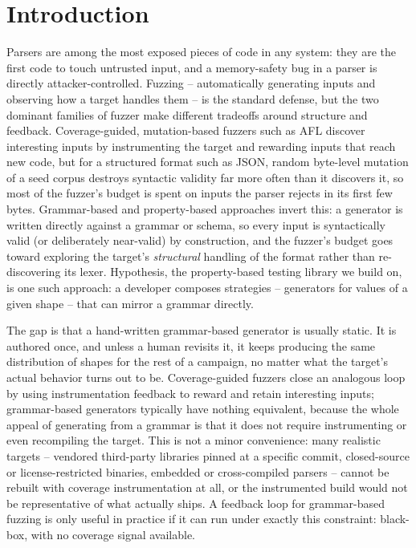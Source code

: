 \section{Introduction}

Parsers are among the most exposed pieces of code in any system: they are
the first code to touch untrusted input, and a memory-safety bug in a parser
is directly attacker-controlled. Fuzzing -- automatically generating inputs
and observing how a target handles them -- is the standard defense, but the
two dominant families of fuzzer make different tradeoffs around structure and
feedback. Coverage-guided, mutation-based fuzzers such as AFL discover
interesting inputs by instrumenting the target and rewarding inputs that
reach new code, but for a structured format such as JSON, random byte-level
mutation of a seed corpus destroys syntactic validity far more often than it
discovers it, so most of the fuzzer's budget is spent on inputs the parser
rejects in its first few bytes. Grammar-based and property-based approaches
invert this: a generator is written directly against a grammar or schema, so
every input is syntactically valid (or deliberately near-valid) by
construction, and the fuzzer's budget goes toward exploring the target's
\emph{structural} handling of the format rather than re-discovering its
lexer. Hypothesis, the property-based testing library we build on, is one
such approach: a developer composes strategies -- generators for values of a
given shape -- that can mirror a grammar directly.

The gap is that a hand-written grammar-based generator is usually static. It
is authored once, and unless a human revisits it, it keeps producing the
same distribution of shapes for the rest of a campaign, no matter what the
target's actual behavior turns out to be. Coverage-guided fuzzers close an
analogous loop by using instrumentation feedback to reward and retain
interesting inputs; grammar-based generators typically have nothing
equivalent, because the whole appeal of generating from a grammar is that it
does not require instrumenting or even recompiling the target. This is not
a minor convenience: many realistic targets -- vendored third-party
libraries pinned at a specific commit, closed-source or license-restricted
binaries, embedded or cross-compiled parsers -- cannot be rebuilt with
coverage instrumentation at all, or the instrumented build would not be
representative of what actually ships. A feedback loop for grammar-based
fuzzing is only useful in practice if it can run under exactly this
constraint: black-box, with no coverage signal available.

